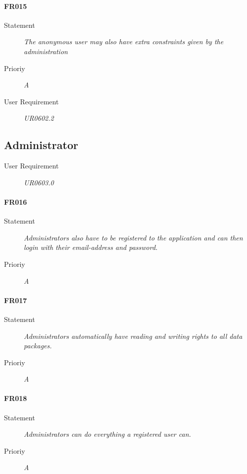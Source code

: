 \paragraph{FR015}
\begin{description}
  \item [Statement]
    \textit{
The anonymous user may also have extra constraints given by the administration
}
  \item [Prioriy] \textit{A}
  \item[User Requirement] \textit{UR0602.2}
\end{description}

\subsection{Administrator}

\begin{description}
\item[User Requirement] \textit{UR0603.0}
\end{description}


\paragraph{FR016}
\begin{description}
  \item [Statement]
    \textit{
Administrators also have to be registered to the application and can then login with their email-address and password.
}
  \item [Prioriy] \textit{A}
\end{description}

\paragraph{FR017}
\begin{description}
  \item [Statement]
    \textit{
Administrators automatically have reading and writing rights to all data packages.
}
  \item [Prioriy] \textit{A}
\end{description}

\paragraph{FR018}
\begin{description}
  \item [Statement]
    \textit{
Administrators can do everything a registered user can.
}
  \item [Prioriy] \textit{A}
\end{description}

